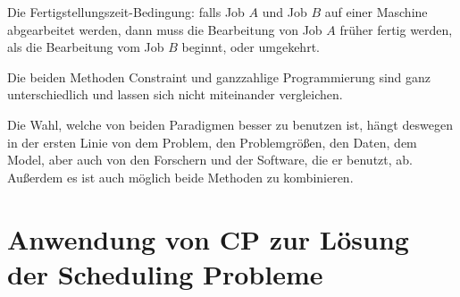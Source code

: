 \documentclass[hyperref={pdfpagelabels=false}]{beamer}
\newcommand{\inhalt}{\frame{   \frametitle{Überblick}   \tableofcontents[currentsection]}}
\begin{document}
\begin{frame}
\begin{itemize}
	\pause
		
	\vspace{5pt}
	{\tiny 
	Die Fertigstellungszeit-Bedingung: falls Job $A$ und Job $B$ auf einer Maschine abgearbeitet werden, dann muss die Bearbeitung von Job $A$ früher fertig werden, als die Bearbeitung vom Job $B$ beginnt, oder umgekehrt.\\}

	\vspace{5pt}
\end{itemize}

\end{frame}
\begin{frame}

Die beiden Methoden Constraint und  ganzzahlige Programmierung sind ganz unterschiedlich und lassen sich nicht miteinander vergleichen.

\vspace{15pt}
Die Wahl, welche von beiden Paradigmen besser zu benutzen ist, hängt deswegen in der ersten Linie von dem Problem, den Problemgrößen, den Daten, dem Model, aber auch von den Forschern und der Software, die er benutzt, ab. Außerdem es ist auch möglich beide Methoden zu kombinieren.

\end{frame}

\section{Anwendung von CP zur Lösung der Scheduling Probleme}
\inhalt
\end{document}
